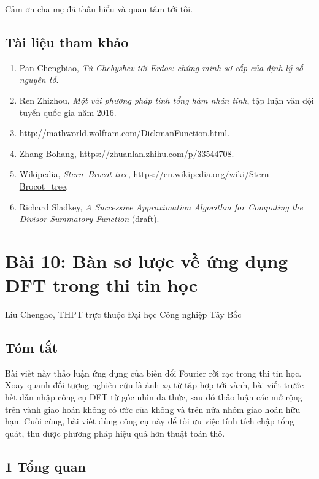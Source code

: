 \documentclass[11pt]{article}
\begin{document}
Cảm ơn cha mẹ đã thấu hiểu và quan tâm tới tôi.

\subsection*{Tài liệu tham khảo}

\begin{enumerate}
  \item Pan Chengbiao, \emph{Từ Chebyshev tới Erdos: chứng minh sơ cấp của định
  lý số nguyên tố}.
  \item Ren Zhizhou, \emph{Một vài phương pháp tính tổng hàm nhân tính}, tập
  luận văn đội tuyển quốc gia năm 2016.
  \item \url{http://mathworld.wolfram.com/DickmanFunction.html}.
  \item Zhang Bohang, \url{https://zhuanlan.zhihu.com/p/33544708}.
  \item Wikipedia, \emph{Stern--Brocot tree},
  \url{https://en.wikipedia.org/wiki/Stern-Brocot_tree}.
  \item Richard Sladkey, \emph{A Successive Approximation Algorithm for
  Computing the Divisor Summatory Function} (draft).
\end{enumerate}

\section{Bài 10: Bàn sơ lược về ứng dụng DFT trong thi tin học}

\begin{center}
Liu Chengao, THPT trực thuộc Đại học Công nghiệp Tây Bắc
\end{center}

\subsection*{Tóm tắt}

Bài viết này thảo luận ứng dụng của biến đổi Fourier rời rạc trong thi tin học.
Xoay quanh đối tượng nghiên cứu là ánh xạ từ tập hợp tới vành, bài viết trước
hết dẫn nhập công cụ DFT từ góc nhìn đa thức, sau đó thảo luận các mở rộng
trên vành giao hoán không có ước của không và trên nửa nhóm giao hoán hữu hạn.
Cuối cùng, bài viết dùng công cụ này để tối ưu việc tính tích chập tổng quát,
thu được phương pháp hiệu quả hơn thuật toán thô.

\subsection*{1 Tổng quan}
\end{document}
